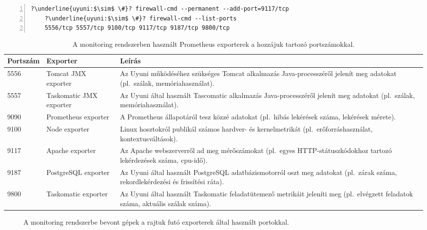 \vspace{2mm}
\begin{lstlisting}[caption=Tűzfalszabályok módosítása.,label=lst:firewalld-add-port, numbers=left,escapechar=?]
	?\underline{uyuni:$\sim$ \#}? firewall-cmd --permanent --add-port=9117/tcp
	?\underline{uyuni:$\sim$ \#}? firewall-cmd --list-ports
	5556/tcp 5557/tcp 9100/tcp 9117/tcp 9187/tcp 9800/tcp
\end{lstlisting}

\begin{table}[h]
	\setlength{\tabcolsep}{5pt}
	\renewcommand{\arraystretch}{1.3}
	\centering
	\begin{tabular}{||l l m{7.6cm}||}
		\hline
		Portszám & Exporter & Leírás \\
		\hline\hline
		5556 & Tomcat JMX exporter & Az Uyuni működéséhez szükséges Tomcat alkalmazás Java-processzéről jelenít meg adatokat (pl.~szálak, memóriahasználat). \\
		\hline
		5557 & Taskomatic JMX exporter & Az Uyuni által használt Tascomatic alkalmazás Java-processzéről jelenít meg adatokat (pl.~szálak, memóriahasználat). \\
		\hline
		9090 & Prometheus exporter & A Prometheus állapotáról tesz közzé adatokat (pl.~hibás lekérések száma, lekérések mérete).  \\
		\hline
		9100 & Node exporter & Linux hosztokról publikál számos hardver- és kernelmetrikát (pl.~erőforráshasználat, kontextusváltások). \\
		\hline
		9117 & Apache exporter & Az Apache webszerverről ad meg mérőszámokat (pl.~egyes HTTP-státuszkódokhoz tartozó lekérdezések száma, \acrshort{cpu}-idő).  \\
		\hline
		9187 & PostgreSQL exporter & Az Uyuni által használt PostgreSQL adatbázismotorról oszt meg adatokat (pl.~zárak száma, rekordlekérdezési és frissítési ráta).  \\
		\hline
		9800 & Taskomatic exporter & Az Uyuni által használt Taskomatic feladatütemező metrikáit jeleníti meg (pl.~elvégzett feladatok száma, aktuális szálak száma).  \\
		\hline
	\end{tabular}
	\caption{A monitoring rendszerben használt Prometheus exporterek a hozzájuk tartozó portszámokkal.}
	\label{tab:monitoring-exporters}
\end{table}

\begin{figure}[ht]
	\centering
	
	\caption{A monitoring rendszerbe bevont gépek a rajtuk futó exporterek által használt portokkal.}
	\label{fig:monitoring-setup}
\end{figure}

